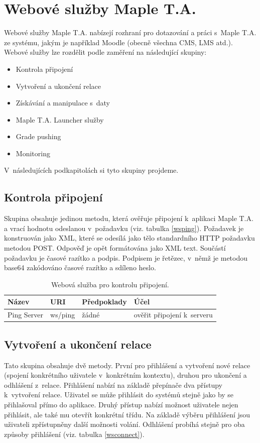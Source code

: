 \documentclass[
print,
  11pt,
  table,   
  nolof,    
  nolot,
  oneside,
  draft
]{fithesis3}
\begin{document}
	\section{Webové služby Maple T.A.}
Webové služby Maple T.A. nabízejí rozhraní pro dotazování a práci s~Maple T.A. ze systému, jakým je například Moodle (obecně všechna CMS, LMS atd.). Webové služby lze rozdělit podle zaměření na následující skupiny:
\begin{itemize}
		\item Kontrola připojení
		\item Vytvoření a ukončení relace
		\item Získávání a manipulace s~daty
		\item Maple T.A. Launcher služby
		\item Grade pushing
		\item Monitoring

\end{itemize}
V~následujících podkapitolách si tyto skupiny projdeme.

		\subsection{Kontrola připojení}
Skupina obsahuje jedinou metodu, která ověřuje připojení k~aplikaci Maple T.A. a vrací hodnotu odeslanou v~požadavku (viz. tabulka \ref{wsping}). Požadavek je konstruován jako XML, které se odesílá jako tělo standardního HTTP požadavku metodou POST. Odpověď je opět formátována jako XML text. Součástí požadavku je časové razítko a podpis. Podpisem je řetězec, v~němž je metodou base64 zakódováno časové razítko a sdíleno heslo.

\begin{table}[htb]
\begin{tabularx}{\textwidth}{|l|l|l|Y|}
\hline
\textbf{Název} & \textbf{URI} & \textbf{Předpoklady}  & \textbf{Účel}  \\
\hline
Ping Server  & ws/ping  & žádné  & ověřit připojení k~serveru\\
\hline
\end{tabularx}
\caption{Webová služba pro kontrolu připojení.}
  \label{tab:wsping}
\end{table}
		\subsection{Vytvoření a ukončení relace}
Tato skupina obsahuje dvě metody. První pro přihlášení a vytvoření nové relace (spojení konkrétního uživatele v~konkrétním kontextu), druhou pro ukončení a odhlášení z~relace. Přihlášení nabízí na základě přepínače dva přístupy k~vytvoření relace. Uživatel se může přihlásit do systémů stejně jako by se přihlašoval přímo do aplikace. Druhý přístup nabízí možnost uživatele nejen přihlásit, ale také mu otevřít konkrétní třídu. Na základě výběru přihlášení jsou uživateli zpřístupněny další možnosti volání. Odhlášení probíhá stejně pro oba způsoby přihlášení (viz. tabulka \ref{wsconnect}).
\end{document}
